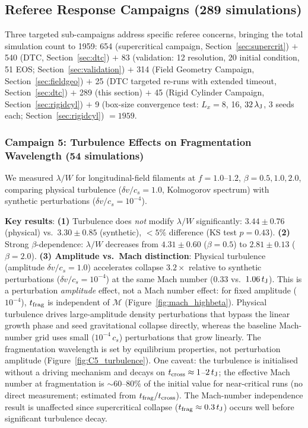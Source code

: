 \documentclass[twoside,twocolumn]{mnras}
\begin{document}
\subsection{Referee Response Campaigns (289 simulations)}
\label{sec:referee_response}

Three targeted sub-campaigns address specific referee concerns, bringing the total
simulation count to 1959: 654 (supercritical campaign, Section~\ref{sec:supercrit})
$+$ 540 (DTC, Section~\ref{sec:dtc}) $+$ 83 (validation: 12 resolution, 20 initial
condition, 51 EOS; Section~\ref{sec:validation}) $+$ 314 (Field Geometry Campaign,
Section~\ref{sec:fieldgeo}) $+$ 25 (DTC targeted re-runs with extended timeout,
Section~\ref{sec:dtc}) $+$ 289 (this section) $+$ 45 (Rigid Cylinder Campaign,
Section~\ref{sec:rigidcyl}) $+$ 9 (box-size convergence test: $L_x = 8$, 16,
$32\,\lambda_{\rm J}$, 3 seeds each; Section~\ref{sec:rigidcyl})
$= 1959$.

\subsubsection{Campaign 5: Turbulence Effects on Fragmentation Wavelength (54 simulations)}

We measured $\lambda/W$ for longitudinal-field filaments at $f = 1.0$--$1.2$,
$\beta = 0.5, 1.0, 2.0$, comparing physical turbulence ($\delta v/c_s = 1.0$,
Kolmogorov spectrum) with synthetic perturbations ($\delta v/c_s = 10^{-4}$).

\textbf{Key results}: \textbf{(1)} Turbulence does \textit{not} modify $\lambda/W$ significantly:
$3.44 \pm 0.76$ (physical) vs.\ $3.30 \pm 0.85$ (synthetic), $<5\%$ difference
(KS test $p = 0.43$). \textbf{(2)} Strong $\beta$-dependence: $\lambda/W$ decreases from
$4.31 \pm 0.60$ ($\beta = 0.5$) to $2.81 \pm 0.13$ ($\beta = 2.0$). \textbf{(3) Amplitude vs.\ Mach distinction}: Physical turbulence (amplitude $\delta v/c_s = 1.0$) accelerates collapse $3.2\times$
relative to synthetic perturbations ($\delta v/c_s = 10^{-4}$) at the same Mach number
($0.33$ vs.\ $1.06\,t_{\rm J}$). This is a perturbation \textit{amplitude} effect, not
a Mach number effect: for fixed amplitude ($10^{-4}$), $t_{\rm frag}$ is independent
of $\mathcal{M}$ (Figure~\ref{fig:mach_highbeta}). Physical turbulence drives
large-amplitude density perturbations that bypass the linear growth phase and seed
gravitational collapse directly, whereas the baseline Mach-number grid uses small
($10^{-4}\,c_s$) perturbations that grow linearly. The fragmentation wavelength
is set by equilibrium properties, not perturbation amplitude (Figure~\ref{fig:C5_turbulence}).
One caveat: the turbulence is initialised without a driving mechanism and decays on $t_{\rm cross} \approx 1$--$2\,t_{\rm J}$; the effective Mach number at fragmentation is $\sim 60$--$80\%$ of the initial value for near-critical runs (no direct measurement; estimated from $t_{\rm frag}/t_{\rm cross}$). The Mach-number independence result is unaffected since supercritical collapse ($t_{\rm frag} \approx 0.3\,t_{\rm J}$) occurs well before significant turbulence decay.
\end{document}
